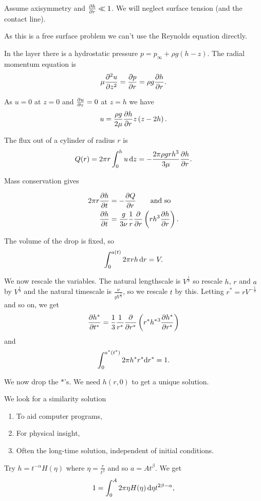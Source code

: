 \documentclass{notes}
\theoremstyle{plain}
\begin{document}
\vspace{1in}

Assume axisymmetry and $\frac{\partial h}{\partial r} \ll 1$.  We will neglect surface tension
(and the contact line).

As this is a free surface problem we can't use the Reynolds equation
directly.

In the layer there is a hydrostatic pressure
$p = p_\infty + \rho g \left( h - z\right)$.  The radial momentum equation
is
\[
\mu \frac{\partial ^2 u}{\partial z^2} = \frac{\partial p}{\partial r} = \rho g \frac{\partial h}{\partial r}.
\]

As $u = 0$ at $z =0$ and $\frac{\partial u}{\partial z} = 0$ at $z = h$ we have
\[
u = \frac{\rho g}{2 \mu} \frac{\partial h}{\partial r} z \left( z - 2 h \right).
\]

The flux out of a cylinder of radius $r$ is
\[
Q(r) = 2 \pi r \int_0^h u\, \mathrm{d} z = - \frac{2 \pi \rho g r h^3}{3 \mu}
\frac{\partial h}{\partial r}.
\]

Mass conservation gives

\begin{align*}
2 \pi r \frac{\partial h}{\partial t} &= - \frac{\partial Q}{\partial r} \qquad \text{and so}\\
\frac{\partial h}{\partial t} &= \frac{g}{3 \nu} \frac{1}{r} \frac{\partial }{\partial r} \left( r h^3 \frac{\partial h}{\partial r}
\right).
\end{align*}

The volume of the drop is fixed, so
\[
\int_0^{a(t)} 2 \pi r h\, \mathrm{d} r = V.
\]

We now rescale the variables.  The natural lengthscale is $V^{\frac{1}{3}}$
so rescale $h$, $r$ and $a$ by $V^{\frac{1}{3}}$ and the natural timescale
is $\frac{\nu}{g V^{\frac{1}{3}}}$, so we rescale $t$ by this.  Letting
$r^\ast = r V^{-\frac{1}{3}}$ and so on, we get
\[
\frac{\partial h^\ast}{\partial t^\ast} = \frac{1}{3} \frac{1}{r^\ast}
\frac{\partial }{\partial r^\ast} \left( r^\ast h^\ast{}^3 \frac{\partial h^\ast}{\partial r^\ast}\right)
\]
and
\[
\int_0^{a^\ast(t^\ast)} 2 \pi h^\ast r^\ast \mathrm{d} r^\ast = 1.
\]

We now drop the $\ast$'s.  We need $h(r,0)$ to get a unique solution.

We look for a similarity solution

\begin{enumerate}
\item To aid computer programs,
\item For physical insight,
\item Often the long-time solution, independent of initial conditions.
\end{enumerate}

Try $h = t^{-\alpha} H(\eta)$ where $\eta = \frac{r}{t^\beta}$
and so $a = A t^\beta$.  We get
\[
1 = \int_0^A 2 \pi \eta H(\eta) \, \mathrm{d} \eta t^{2 \beta - \alpha},
\]
\end{document}

